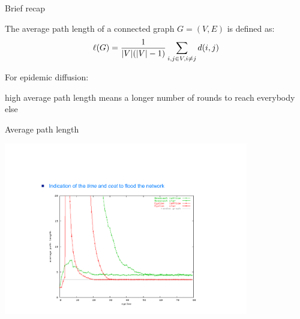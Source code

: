 \begin{frame}{Brief recap}

\begin{definition}
The \alert{average path length} of a connected graph $G=(V,E)$ is defined as:
\[
  \ell(G) = \frac{1}{|V|(|V|-1)} \sum_{i,j \in V, i \neq j} d(i,j)
\]
\end{definition}

\bigskip
For epidemic diffusion:
\BI
\item high average path length means a longer number of rounds to reach
  everybody else
\EI


\end{frame}

\begin{frame}{Average path length}
	
\begin{center}
\includegraphics[width=0.8\textwidth]{path}	
\end{center}

	
\end{frame}


